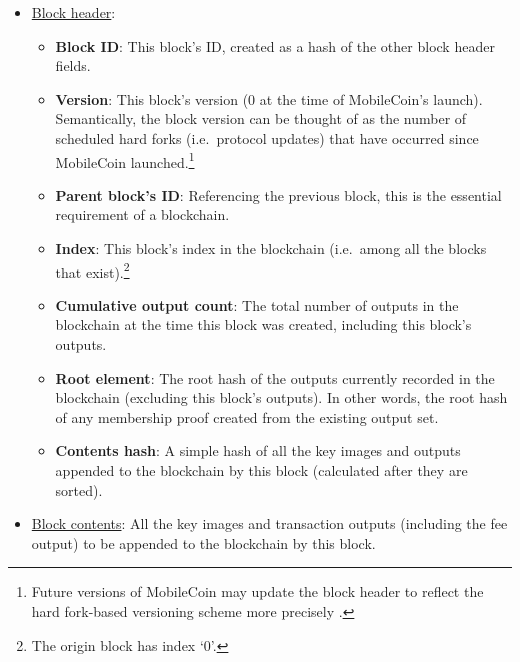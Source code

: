 \begin{itemize}
    \item \underline{Block header}:
    \begin{itemize}
        \item \textbf{Block ID}: This block's ID, created as a hash of the other block header fields.

        \item \textbf{Version}: This block's version (0 at the time of MobileCoin's launch). Semantically, the block version can be thought of as the number of scheduled hard forks (i.e.\ protocol updates) that have occurred since MobileCoin launched.\footnote{Future versions of MobileCoin may update the block header to reflect the hard fork-based versioning scheme more precisely \cite{rfc-mobilecoin-hardforks}.}

        \item \textbf{Parent block's ID}: Referencing the previous block, this is the essential requirement of a blockchain.

        \item \textbf{Index}: This block's index in the blockchain (i.e.\ among all the blocks that exist).\footnote{The origin block has index `0'.}

        \item \textbf{Cumulative output count}: The total number of outputs in the blockchain at the time this block was created, including this block's outputs.

        \item \textbf{Root element}: The root hash of the outputs currently recorded in the blockchain (excluding this block's outputs). In other words, the root hash of any membership proof created from the existing output set.

        \item \textbf{Contents hash}: A simple hash of all the key images and outputs appended to the blockchain by this block (calculated after they are sorted).
    \end{itemize}

    \item \underline{Block contents}: All the key images and transaction outputs (including the fee output) to be appended to the blockchain by this block.


\end{itemize}
